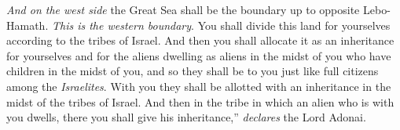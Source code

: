 \begin{biblechapter}
\verse \textit{And on the west side} the Great Sea shall be the boundary up to opposite Lebo-Hamath. \textit{This is the western boundary}.
\verse You shall divide this land for yourselves according to the tribes of Israel.
\verse And then you shall allocate it as an inheritance for yourselves and for the aliens dwelling as aliens in the midst of you who have children in the midst of you, and so they shall be to you just like full citizens among the \textit{Israelites}. With you they shall be allotted with an inheritance in the midst of the tribes of Israel.
\verse And then in the tribe in which an alien who is with you dwells, there you shall give his inheritance,” \textit{declares} the Lord Adonai.
\end{biblechapter}

